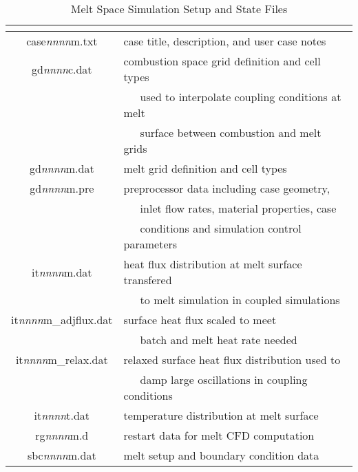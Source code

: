 \documentclass[twoside,12pt]{article}
\newcommand{\var}[1]{\text{\it #1}}
\numberwithin{equation}{section}
\begin{document}
\begin{table}[!hbp]
\caption{Melt Space Simulation Setup and State Files}
\label{sim-files-melt}
\centering
\begin{tabular}{|c|l|}
\hline
\var{File Name} & \multicolumn{1}{|c|}{ \var{Explanation}} \\
\hline
case\textit{nnnn}m.txt & case title, description, and user case notes \\
gd\textit{nnnn}c.dat  & combustion space grid definition and cell types \\
                      & ~~~used to interpolate coupling conditions at melt \\
                      & ~~~surface between combustion and melt grids \\
gd\textit{nnnn}m.dat  & melt grid definition and cell types \\
gd\textit{nnnn}m.pre  & preprocessor data including case geometry, \\
                      & ~~~inlet flow rates, material properties, case \\
                      & ~~~conditions and simulation control parameters \\
it\textit{nnnn}m.dat  & heat flux distribution at melt surface transfered \\
                      & ~~~to melt simulation in coupled simulations \\
it\textit{nnnn}m\_adjflux.dat  & surface heat flux scaled to meet \\
                      & ~~~batch and melt heat rate needed \\
it\textit{nnnn}m\_relax.dat  & relaxed surface heat flux distribution used to \\
                      & ~~~damp large oscillations in coupling conditions \\
it\textit{nnnn}t.dat  & temperature distribution at melt surface \\
rg\textit{nnnn}m.d  & restart data for melt CFD computation \\
sbc\textit{nnnn}m.dat  & melt setup and boundary condition data \\
\hline
\end{tabular}
\end{table}
\end{document}
